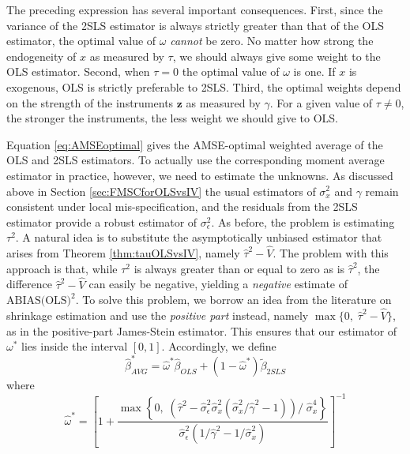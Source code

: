 The preceding expression has several important consequences. 
First, since the variance of the 2SLS estimator is always strictly greater than that of the OLS estimator, the optimal value of $\omega$ \emph{cannot} be zero. 
No matter how strong the endogeneity of $x$ as measured by $\tau$, we should always give some weight to the OLS estimator. 
Second, when $\tau = 0$ the optimal value of $\omega$ is one. If $x$ is exogenous, OLS is strictly preferable to 2SLS. 
Third, the optimal weights depend on the strength of the instruments $\mathbf{z}$ as measured by $\gamma$. 
For a given value of $\tau\neq 0$, the stronger the instruments, the less weight we should give to OLS.

Equation \ref{eq:AMSEoptimal} gives the AMSE-optimal weighted average of the OLS and 2SLS estimators. 
To actually use the corresponding moment average estimator in practice, however, we need to estimate the unknowns.
As discussed above in Section \ref{sec:FMSCforOLSvsIV} the usual estimators of $\sigma_x^2$ and $\gamma$ remain consistent under local mis-specification, and the residuals from the 2SLS estimator provide a robust estimator of $\sigma_\epsilon^2$.
As before, the problem is estimating $\tau^2$.
A natural idea is to substitute the asymptotically unbiased estimator that arises from Theorem \ref{thm:tauOLSvsIV}, namely $\widehat{\tau}^2 - \widehat{V}$. 
The problem with this approach is that, while $\tau^2$ is always greater than or equal to zero as is $\widehat{\tau}^2$, the difference $\widehat{\tau}^2 - \widehat{V}$ can easily be negative, yielding a \emph{negative} estimate of $\mbox{ABIAS(OLS)}^2$.
To solve this problem, we borrow an idea from the literature on shrinkage estimation and use the \emph{positive part} instead, namely $\max\{0, \; \widehat{\tau}^2 - \widehat{V}\}$, as in the positive-part James-Stein estimator.
This ensures that our estimator of $\omega^*$ lies inside the interval $[0,1]$.
Accordingly, we define 
\begin{equation}
	\widehat{\beta}^*_{AVG} = \widehat{\omega}^* \widehat{\beta}_{OLS} + (1 - \widehat{\omega}^*)\widetilde{\beta}_{2SLS}
	\label{eq:OLSvsIV_AVG1}
\end{equation}
where
\begin{equation}
\widehat{\omega }^* = \left[1 + \frac{\max \left\{0, \; \left(\widehat{\tau}^2 - \widehat{\sigma}_\epsilon^2\widehat{\sigma}_x^2  \left(\widehat{\sigma}_x^2/\widehat{\gamma}^2 - 1 \right) \right)/\;\widehat{\sigma}_x^4 \right\}}{\widehat{\sigma}_\epsilon^2 (1/\widehat{\gamma}^2 - 1/\widehat{\sigma}_x^2)}\right]^{-1}
	\label{eq:OLSvsIV_AVG2}
\end{equation}

